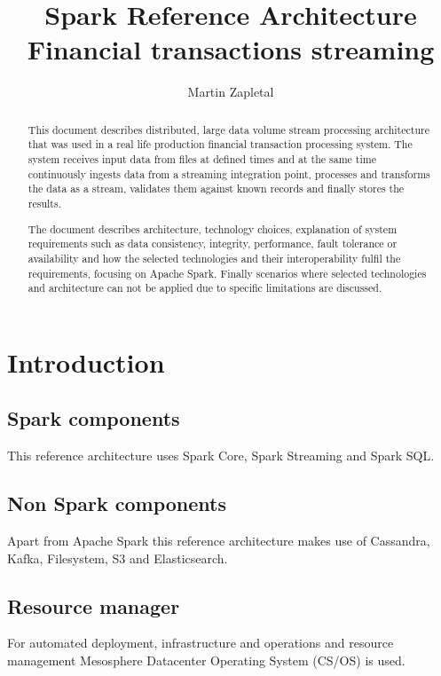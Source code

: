 \documentclass[a4paper, 10 pt, conference]{IEEEtran}
\title{Spark Reference Architecture \\ Financial transactions streaming}
\author{Martin Zapletal%
}
\begin{document}
\maketitle
\thispagestyle{empty}
\pagestyle{empty}

\begin{abstract}
This document describes distributed, large data volume stream processing architecture that was used in a real life production financial transaction processing system. The system receives input data from files at defined times and at the same time continuously ingests data from a streaming integration point, processes and transforms the data as a stream, validates them against known records and finally stores the results.

The document describes architecture, technology choices, explanation of system requirements such as data consistency, integrity, performance, fault tolerance or availability and how the selected technologies and their interoperability fulfil the requirements, focusing on Apache Spark. Finally scenarios where selected technologies and architecture can not be applied due to specific limitations are discussed.
\end{abstract}


\section{Introduction}

\subsection{Spark components}
This reference architecture uses Spark Core, Spark Streaming and Spark SQL.

\subsection{Non Spark components}

Apart from Apache Spark this reference architecture makes use of Cassandra, Kafka, Filesystem, S3 and Elasticsearch.

\subsection{Resource manager}
For automated deployment, infrastructure and operations and resource management Mesosphere Datacenter Operating System (CS/OS) is used.
\end{document}
